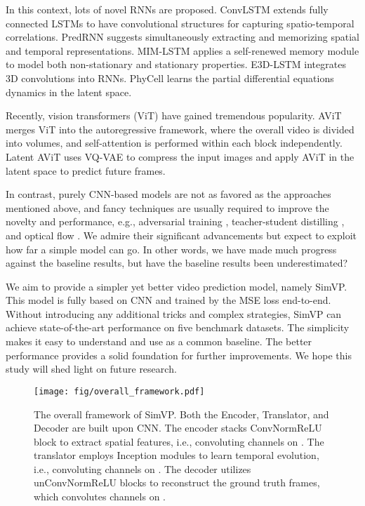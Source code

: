 \documentclass[10pt,twocolumn,letterpaper]{article}
\begin{document}
In this context, lots of novel RNNs are proposed. ConvLSTM \cite{xingjian2015convolutional} extends fully connected LSTMs to have convolutional structures for capturing spatio-temporal correlations. PredRNN \cite{wang2017predrnn} suggests simultaneously extracting and memorizing spatial and temporal representations. MIM-LSTM \cite{wang2019memory} applies a self-renewed memory module to model both non-stationary and stationary properties. E3D-LSTM \cite{wang2018eidetic} integrates 3D convolutions into RNNs. PhyCell \cite{guen2020disentangling} learns the partial differential equations dynamics in the latent space. 

Recently, vision transformers (ViT) have gained tremendous popularity. AViT \cite{weissenborn2019scaling} merges ViT into the autoregressive framework, where the overall video is divided into volumes, and self-attention is performed within each block independently. Latent AViT \cite{rakhimov2020latent} uses VQ-VAE \cite{oord2017neural} to compress the input images and apply AViT in the latent space to predict future frames. 

In contrast, purely CNN-based models are not as favored as the approaches mentioned above, and fancy techniques are usually required to improve the novelty and performance, e.g., adversarial training \cite{kwon2019predicting}, teacher-student distilling \cite{chiu2020segmenting}, and optical flow \cite{gao2019disentangling}. We admire their significant advancements but expect to exploit how far a simple model can go. In other words, we have made much progress against the baseline results, but have the baseline results been underestimated?

We aim to provide a simpler yet better video prediction model, namely SimVP. This model is fully based on CNN and trained by the MSE loss end-to-end. Without introducing any additional tricks and complex strategies, SimVP can achieve state-of-the-art performance on five benchmark datasets. The simplicity makes it easy to understand and use as a common baseline. The better performance provides a solid foundation for further improvements. We hope this study will shed light on future research.

\begin{figure*}[h]
  \centering
      \texttt{[image: fig/overall\_framework.pdf]}
    \caption{The overall framework of SimVP. Both the Encoder, Translator, and Decoder are built upon CNN. The encoder stacks  ConvNormReLU block to extract spatial features, i.e., convoluting  channels on . The translator employs  Inception modules to learn temporal evolution, i.e., convoluting  channels on . The decoder utilizes  unConvNormReLU blocks to reconstruct the ground truth frames, which convolutes  channels on . } \label{fig:overall_framework}
    \vspace{-4mm}
\end{figure*}
\end{document}
